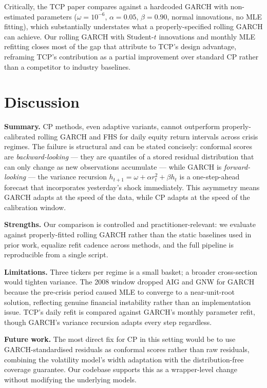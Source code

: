 \documentclass{article}
\begin{document}
Critically, the TCP paper \citep{aich2026} compares against a hardcoded GARCH with non-estimated parameters (\(\omega=10^{-6}\), \(\alpha=0.05\), \(\beta=0.90\), normal innovations, no MLE fitting), which substantially understates what a properly-specified rolling GARCH can achieve. Our rolling GARCH with Student-\(t\) innovations and monthly MLE refitting closes most of the gap that \citealt{aich2026} attribute to TCP's design advantage, reframing TCP's contribution as a partial improvement over standard CP rather than a competitor to industry baselines.

\section{Discussion}

\textbf{Summary.} CP methods, even adaptive variants, cannot outperform properly-calibrated rolling GARCH and FHS for daily equity return intervals across crisis regimes. The failure is structural and can be stated concisely: conformal scores are \emph{backward-looking} --- they are quantiles of a stored residual distribution that can only change as new observations accumulate --- while GARCH is \emph{forward-looking} --- the variance recursion \(h_{t+1} = \omega + \alpha r_t^2 + \beta h_t\) is a one-step-ahead forecast that incorporates yesterday's shock immediately. This asymmetry means GARCH adapts at the speed of the data, while CP adapts at the speed of the calibration window.

\textbf{Strengths.} Our comparison is controlled and practitioner-relevant: we evaluate against properly-fitted rolling GARCH rather than the static baselines used in prior work, equalize refit cadence across methods, and the full pipeline is reproducible from a single script.

\textbf{Limitations.} Three tickers per regime is a small basket; a broader cross-section would tighten variance. The 2008 window dropped AIG and GNW for GARCH because the pre-crisis period caused MLE to converge to a near-unit-root solution, reflecting genuine financial instability rather than an implementation issue. TCP's daily refit is compared against GARCH's monthly parameter refit, though GARCH's variance recursion adapts every step regardless.

\textbf{Future work.} The most direct fix for CP in this setting would be to use GARCH-standardised residuals as conformal scores rather than raw residuals, combining the volatility model's width adaptation with the distribution-free coverage guarantee. Our codebase supports this as a wrapper-level change without modifying the underlying models.
\end{document}
